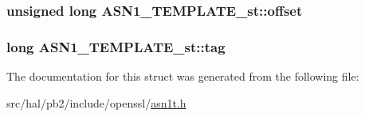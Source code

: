 \subsubsection[{\texorpdfstring{offset}{offset}}]{\setlength{\rightskip}{0pt plus 5cm}unsigned long A\+S\+N1\+\_\+\+T\+E\+M\+P\+L\+A\+T\+E\+\_\+st\+::offset}\hypertarget{struct_a_s_n1___t_e_m_p_l_a_t_e__st_a6fed94625b157be3f3513fda21ae464f}{}\label{struct_a_s_n1___t_e_m_p_l_a_t_e__st_a6fed94625b157be3f3513fda21ae464f}
\subsubsection[{\texorpdfstring{tag}{tag}}]{\setlength{\rightskip}{0pt plus 5cm}long A\+S\+N1\+\_\+\+T\+E\+M\+P\+L\+A\+T\+E\+\_\+st\+::tag}\hypertarget{struct_a_s_n1___t_e_m_p_l_a_t_e__st_a8ef37d4a92684f1305627489e11a6b2e}{}\label{struct_a_s_n1___t_e_m_p_l_a_t_e__st_a8ef37d4a92684f1305627489e11a6b2e}


The documentation for this struct was generated from the following file\+:\begin{DoxyCompactItemize}
\item 
src/hal/pb2/include/openssl/\hyperlink{asn1t_8h}{asn1t.\+h}\end{DoxyCompactItemize}
